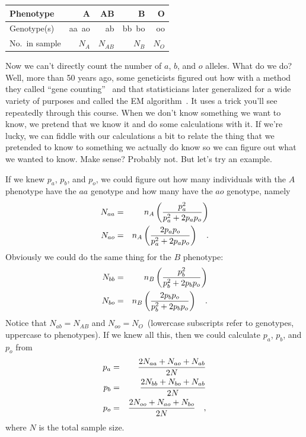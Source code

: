 \documentclass[12pt]{article}
\begin{document}
\begin{center}
\begin{tabular}{l|r|r|r|r}
\hline\hline
Phenotype      & A      & AB       & B       & O  \\
\hline
Genotype(s)    & aa\ ao & ab       & bb\ bo  & oo \\
No.\ in sample & $N_A$  & $N_{AB}$ & $N_{B}$ & $N_O$ \\
\hline
\end{tabular}
\end{center}
Now we can't directly count the number of $a$, $b$, and $o$
alleles. What do we do? Well, more than 50 years ago, some geneticists
figured out how with a method they called ``gene
counting''~\cite{Ceppellini-etal-1955} and that statisticians later
generalized for a wide variety of purposes and called the EM
algorithm~\cite{Dempster-etal-1977}. It uses a trick you'll see
repeatedly through this course. When we don't know something we want
to know, we pretend that we know it and do some calculations with
it. If we're lucky, we can fiddle with our calculations a bit to
relate the thing that we pretended to know to something we actually do
know so we can figure out what we wanted to know. Make sense? Probably
not. But let's try an example.

If we knew $p_a$, $p_b$, and $p_o$, we could figure out how many
individuals with the $A$ phenotype have the $aa$ genotype and how many
have the $ao$ genotype, namely
\begin{eqnarray*}
N_{aa} &=& n_A \left({p_a^2 \over p_a^2 + 2p_ap_o}\right) \\
N_{ao} &=& n_A \left({2p_ap_o \over p_a^2 + 2p_ap_o}\right) \quad .
\end{eqnarray*}
Obviously we could do the same thing for the $B$ phenotype:
\begin{eqnarray*}
N_{bb} &=& n_B \left({p_b^2 \over p_b^2 + 2p_bp_o}\right) \\
N_{bo} &=& n_B \left({2p_bp_o \over p_b^2 + 2p_bp_o}\right) \quad .
\end{eqnarray*}
Notice that $N_{ab} = N_{AB}$ and $N_{oo} = N_O$~(lowercase
subscripts refer to genotypes, uppercase to phenotypes). If we knew
all this, then we could calculate $p_a$, $p_b$, and $p_o$ from
\begin{eqnarray*}
p_a &=& {2N_{aa} + N_{ao} + N_{ab} \over 2N} \\
p_b &=& {2N_{bb} + N_{bo} + N_{ab} \over 2N} \\
p_o &=& {2N_{oo} + N_{ao} + N_{bo} \over 2N} \quad ,
\end{eqnarray*}
where $N$ is the total sample size.
\end{document}
